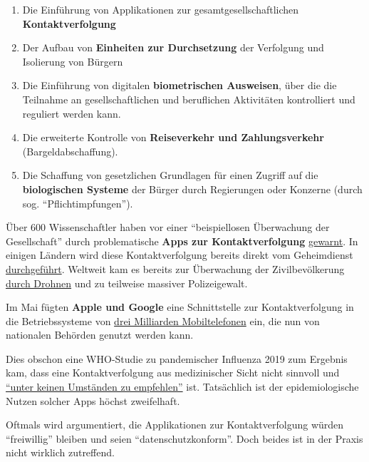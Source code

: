 \begin{enumerate}
\def\labelenumi{\arabic{enumi}.}
\tightlist
\item
  Die Einführung von Applikationen zur gesamtgesellschaftlichen
  \textbf{Kontaktverfolgung}
\item
  Der Aufbau von \textbf{Einheiten zur Durchsetzung} der Verfolgung und
  Isolierung von Bürgern
\item
  Die Einführung von digitalen \textbf{biometrischen Ausweisen}, über
  die die Teilnahme an gesellschaftlichen und beruflichen Aktivitäten
  kontrolliert und reguliert werden kann.
\item
  Die erweiterte Kontrolle von \textbf{Reiseverkehr und Zahlungsverkehr}
  (Bargeldabschaffung).
\item
  Die Schaffung von gesetzlichen Grundlagen für einen Zugriff auf die
  \textbf{biologischen Systeme} der Bürger durch Regierungen oder
  Konzerne (durch sog. ``Pflichtimpfungen'').
\end{enumerate}

Über 600 Wissenschaftler haben vor einer ``beispiellosen Überwachung der
Gesellschaft'' durch problematische \textbf{Apps zur
Kontakt­­verfolgung}
\href{https://www.esat.kuleuven.be/cosic/sites/contact-tracing-joint-statement/}{gewarnt}.
In einigen Ländern wird diese Kontakt­ver­folgung bereits direkt vom
Geheimdienst
\href{https://www.jewishpress.com/news/the-courts/state-to-high-court-even-more-shin-bet-involvement-in-fighting-the-coronavirus/2020/04/14/}{durchgeführt}.
Weltweit kam es bereits zur Überwachung der Zivilbevölkerung
\href{https://off-guardian.org/2020/04/25/50-headlines-darker-more-of-the-new-normal/}{durch
Drohnen} und zu teilweise massiver Polizeigewalt.

Im Mai fügten \textbf{Apple und Google} eine Schnittstelle zur
Kontaktverfolgung in die Betriebs­systeme von
\href{https://www.bloomberg.com/news/articles/2020-04-10/apple-google-bring-covid-19-contact-tracing-to-3-billion-people}{drei
Milliarden Mobiltelefonen} ein, die nun von nationalen Behörden genutzt
werden kann.

Dies obschon eine WHO-Studie zu pandemischer Influenza 2019 zum Ergebnis
kam, dass eine Kontaktverfolgung aus medizinischer Sicht nicht sinnvoll
und
\href{https://apps.who.int/iris/bitstream/handle/10665/329438/9789241516839-eng.pdf\#page=9}{``unter
keinen Umständen zu empfehlen''} ist. Tatsächlich ist der
epidemiologische Nutzen solcher Apps höchst zweifelhaft.

Oftmals wird argumentiert, die Applikationen zur Kontaktverfolgung
würden ``freiwillig'' bleiben und seien ``datenschutzkonform''. Doch
beides ist in der Praxis nicht wirklich zutreffend.

